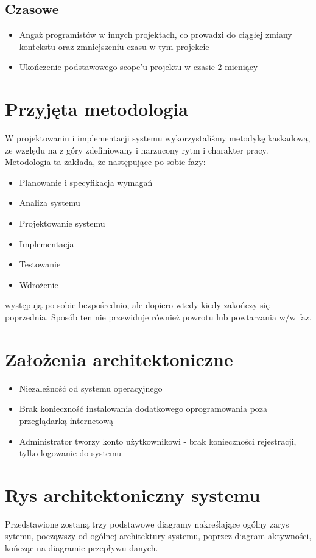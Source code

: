\documentclass{article}
\begin{document}
\subsection{Czasowe}
\begin{itemize}
  \item Angaż programistów w innych projektach, co prowadzi do ciągłej zmiany kontekstu oraz zmniejszeniu czasu w tym projekcie
  \item Ukończenie podstawowego scope'u projektu w czasie 2 mieniący
\end{itemize}


\section{Przyjęta metodologia}
W projektowaniu i implementacji systemu wykorzystaliśmy metodykę kaskadową, ze względu na z góry zdefiniowany i narzucony rytm i charakter pracy. Metodologia ta zakłada, że następujące po sobie fazy:
\begin{itemize}
  \item Planowanie i specyfikacja wymagań
  \item Analiza systemu
  \item Projektowanie systemu
  \item Implementacja
  \item Testowanie
  \item Wdrożenie
\end{itemize}
występują po sobie bezpośrednio, ale dopiero wtedy kiedy zakończy się poprzednia. Sposób ten nie przewiduje również powrotu lub powtarzania w/w faz.


\section{Założenia architektoniczne}
\begin{itemize}
  \item Niezależność od systemu operacyjnego
  \item Brak konieczność instalowania dodatkowego oprogramowania poza przeglądarką internetową
  \item Administrator tworzy konto użytkownikowi - brak konieczności rejestracji, tylko logowanie do systemu
\end{itemize}


\section{Rys architektoniczny systemu}
Przedstawione zostaną trzy podstawowe diagramy nakreślające ogólny zarys sytemu, począwszy od ogólnej architektury systemu, poprzez diagram aktywności, kończąc na diagramie przepływu danych.
\end{document}
